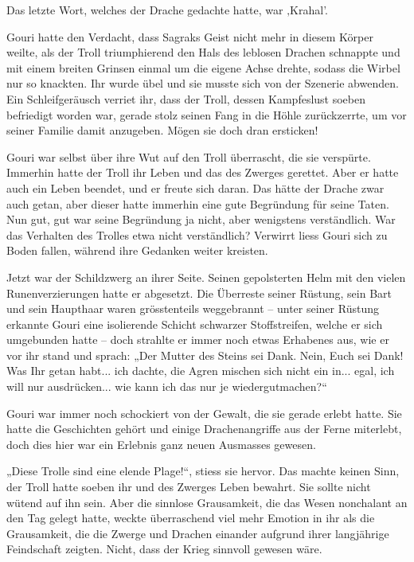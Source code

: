 Das letzte Wort, welches der Drache gedachte hatte, war ‚Krahal’.

Gouri hatte den Verdacht, dass Sagraks Geist nicht mehr in diesem Körper weilte, als der Troll triumphierend den Hals des leblosen Drachen schnappte und mit einem breiten Grinsen einmal um die eigene Achse drehte, sodass die Wirbel nur so knackten. Ihr wurde übel und sie musste sich von der Szenerie abwenden. Ein Schleifgeräusch verriet ihr, dass der Troll, dessen Kampfeslust soeben befriedigt worden war, gerade stolz seinen Fang in die Höhle zurückzerrte, um vor seiner Familie damit anzugeben. Mögen sie doch dran ersticken!

Gouri war selbst über ihre Wut auf den Troll überrascht, die sie verspürte. Immerhin hatte der Troll ihr Leben und das des Zwerges gerettet. Aber er hatte auch ein Leben beendet, und er freute sich daran. Das hätte der Drache zwar auch getan, aber dieser hatte immerhin eine gute Begründung für seine Taten. Nun gut, gut war seine Begründung ja nicht, aber wenigstens verständlich. War das Verhalten des Trolles etwa nicht verständlich? Verwirrt liess Gouri sich zu Boden fallen, während ihre Gedanken weiter kreisten.

Jetzt war der Schildzwerg an ihrer Seite. Seinen gepolsterten Helm mit den vielen Runenverzierungen hatte er abgesetzt. Die Überreste seiner Rüstung, sein Bart und sein Haupthaar waren grösstenteils weggebrannt – unter seiner Rüstung erkannte Gouri eine isolierende Schicht schwarzer Stoffstreifen, welche er sich umgebunden hatte – doch strahlte er immer noch etwas Erhabenes aus, wie er vor ihr stand und sprach: „Der Mutter des Steins sei Dank. Nein, Euch sei Dank! Was Ihr getan habt... ich dachte, die Agren mischen sich nicht ein in... egal, ich will nur ausdrücken... wie kann ich das nur je wiedergutmachen?“

Gouri war immer noch schockiert von der Gewalt, die sie gerade erlebt hatte. Sie hatte die Geschichten gehört und einige Drachenangriffe aus der Ferne miterlebt, doch dies hier war ein Erlebnis ganz neuen Ausmasses gewesen.

„Diese Trolle sind eine elende Plage!“, stiess sie hervor. Das machte keinen Sinn, der Troll hatte soeben ihr und des Zwerges Leben bewahrt. Sie sollte nicht wütend auf ihn sein. Aber die sinnlose Grausamkeit, die das Wesen nonchalant an den Tag gelegt hatte, weckte überraschend viel mehr Emotion in ihr als die Grausamkeit, die die Zwerge und Drachen einander aufgrund ihrer langjährige Feindschaft zeigten. Nicht, dass der Krieg sinnvoll gewesen wäre.

